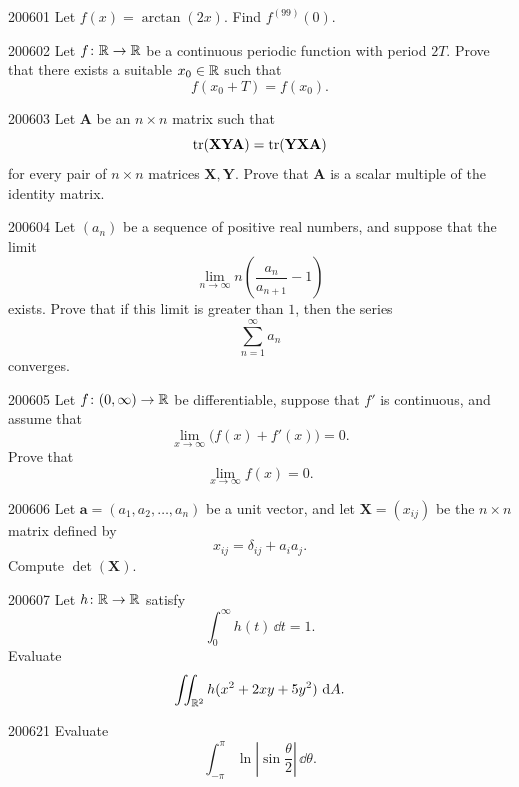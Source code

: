 
\begin{problem}{2006}{0}{1}
Let $f(x)=\arctan(2x)$. Find $f^{(99)}(0)$.
\end{problem}

\begin{problem}{2006}{0}{2}
Let $f\colon\mathbb{R}\to\mathbb{R}$ be a continuous periodic function with period $2T$. Prove that there exists a suitable $x_0\in\mathbb{R}$ such that
\[
    f(x_0+T)=f(x_0).
\]
\end{problem}

\begin{problem}{2006}{0}{3}
Let $\mathbf A$ be an $n\times n$ matrix such that
\[
    \operatorname{tr}(\mathbf X\mathbf Y\mathbf A)=\operatorname{tr}(\mathbf Y\mathbf X\mathbf A)
\]
for every pair of $n\times n$ matrices $\mathbf X, \mathbf Y$. Prove that $\mathbf A$ is a scalar multiple of the identity matrix.
\end{problem}

\begin{problem}{2006}{0}{4}
Let $(a_n)$ be a sequence of positive real numbers, and suppose that the limit
\[
    \lim_{n\to\infty}n\left(\frac{a_n}{a_{n+1}}-1\right)
\]
exists. Prove that if this limit is greater than $1$, then the series
\[
    \sum_{n=1}^{\infty}a_n
\]
converges.
\end{problem}

\begin{problem}{2006}{0}{5}
Let $f\colon(0, \infty)\to\mathbb{R}$ be differentiable, suppose that $f'$ is continuous, and assume that
\[
    \lim_{x\to\infty}\bigl(f(x)+f'(x)\bigr)=0.
\]
Prove that
\[
    \lim_{x\to\infty}f(x)=0.
\]
\end{problem}

\begin{problem}{2006}{0}{6}
Let $\mathbf a=(a_1, a_2, \dots, a_n)$ be a unit vector, and let $\mathbf X=(x_{ij})$ be the $n\times n$ matrix defined by
\[
    x_{ij}=\delta_{ij}+a_i a_j.
\]
Compute $\det(\mathbf X)$.
\end{problem}

\begin{problem}{2006}{0}{7}
Let $h\colon\mathbb{R}\to\mathbb{R}$ satisfy
\[
    \int_0^{\infty}h(t)\, \dd t=1.
\]
Evaluate
\[
    \iint_{\mathbb{R}^2}h(x^2+2xy+5y^2)\, \mathop{}\!\mathrm{d} A.
\]
\end{problem}

\begin{problem}{2006}{2}{1}
Evaluate
\[
    \int_{-\pi}^{\pi}\ln\left|\sin\frac{\theta}{2}\right|\, \dd\theta.
\]
\end{problem}

